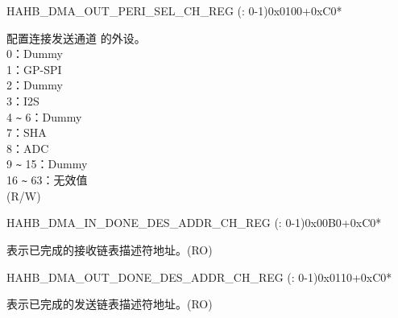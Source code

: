 \begin{register}{H}{AHB\_DMA\_OUT\_PERI\_SEL\_CH\_REG (: 0-1)}{0x0100+0xC0*}\label{regdesc:AHBDMAOUTPERISELCHNREG}
%
%
\regnewline%
\begin{regdesc}\begin{reglist}
\label{fielddesc:AHBDMAPERIOUTSELCHN}\item [AHB\_DMA\_PERI\_OUT\_SEL\_CH\regindex{n}] 配置连接发送通道  的外设。\\
0：Dummy\\ 1：GP-SPI\\ 2：Dummy\\ 3：I2S\\ 4 \verb+~+ 6：Dummy\\ 7：SHA\\ 8：ADC\\ 9 \verb+~+ 15：Dummy\\ 16 \verb+~+ 63：无效值\\ (R/W)
\end{reglist}\end{regdesc}
\end{register}


\begin{register}{H}{AHB\_DMA\_IN\_DONE\_DES\_ADDR\_CH\_REG (: 0-1)}{0x00B0+0xC0*}\label{regdesc:AHBDMAINDONEDESADDRCHNREG}
%
\regnewline%
\begin{regdesc}\begin{reglist}
\label{fielddesc:AHBDMAINDONEDESADDRCHN}\item [AHB\_DMA\_IN\_DONE\_DES\_ADDR\_CH\regindex{n}] 表示已完成的接收链表描述符地址。(RO)
\end{reglist}\end{regdesc}
\end{register}


\begin{register}{H}{AHB\_DMA\_OUT\_DONE\_DES\_ADDR\_CH\_REG (: 0-1)}{0x0110+0xC0*}\label{regdesc:AHBDMAOUTDONEDESADDRCHNREG}
%
\regnewline%
\begin{regdesc}\begin{reglist}
\label{fielddesc:AHBDMAOUTDONEDESADDRCHN}\item [AHB\_DMA\_OUT\_DONE\_DES\_ADDR\_CH\regindex{n}] 表示已完成的发送链表描述符地址。(RO)
\end{reglist}\end{regdesc}
\end{register}


